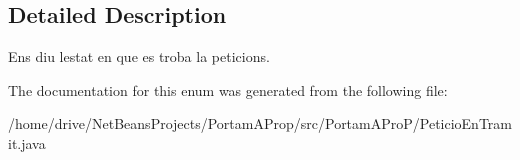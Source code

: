 \subsection{Detailed Description}
Ens diu l\textquotesingle{}estat en que es troba la peticions. 

The documentation for this enum was generated from the following file\+:\begin{DoxyCompactItemize}
\item 
/home/drive/\+Net\+Beans\+Projects/\+Portam\+A\+Prop/src/\+Portam\+A\+Pro\+P/Peticio\+En\+Tramit.\+java\end{DoxyCompactItemize}
